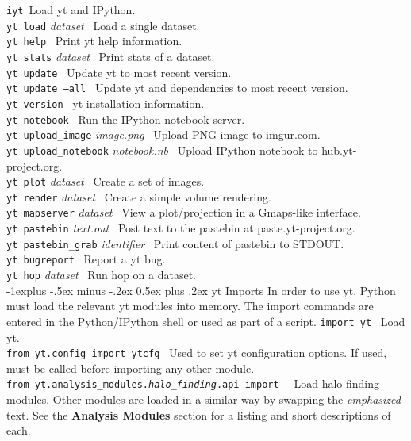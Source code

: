 \documentclass[10pt,landscape]{article}
\makeatletter
\renewcommand{\subsection}{\@startsection{subsection}{2}{0mm}%
                                {-1explus -.5ex minus -.2ex}%
                                {0.5ex plus .2ex}%
                                {\normalfont\normalsize\bfseries}}
\makeatother
\begin{document}
\begin{multicols}{3}
\texttt{iyt}\textemdash\ Load yt and IPython. \\
\texttt{yt load} \textit{dataset}   \textemdash\ Load a single dataset.  \\
\texttt{yt help} \textemdash\ Print yt help information. \\
\texttt{yt stats} \textit{dataset} \textemdash\ Print stats of a dataset. \\
\texttt{yt update} \textemdash\ Update yt to most recent version.\\
\texttt{yt update --all} \textemdash\ Update yt and dependencies to most recent version. \\
\texttt{yt version} \textemdash\ yt installation information. \\
\texttt{yt notebook} \textemdash\ Run the IPython notebook server. \\
\texttt{yt upload\_image} \textit{image.png} \textemdash\ Upload PNG image to imgur.com. \\
\texttt{yt upload\_notebook} \textit{notebook.nb} \textemdash\ Upload IPython notebook to hub.yt-project.org.\\
\texttt{yt plot} \textit{dataset} \textemdash\ Create a set of images.\\
\texttt{yt render} \textit{dataset} \textemdash\ Create a simple
 volume rendering. \\
\texttt{yt mapserver} \textit{dataset} \textemdash\ View a plot/projection in a Gmaps-like
 interface. \\
\texttt{yt pastebin} \textit{text.out} \textemdash\ Post text to the pastebin at
 paste.yt-project.org. \\
\texttt{yt pastebin\_grab} \textit{identifier} \textemdash\ Print content of pastebin to
 STDOUT. \\
\texttt{yt bugreport} \textemdash\ Report a yt bug. \\
\texttt{yt hop} \textit{dataset} \textemdash\  Run hop on a dataset. \\

\subsection{yt Imports}
In order to use yt, Python must load the relevant yt modules into memory.
The import commands are entered in the Python/IPython shell or
used as part of a script.
\newlength{\MyLen}
\texttt{import yt}  \textemdash\
Load yt. \\
\texttt{from yt.config import ytcfg}  \textemdash\
Used to set yt configuration options.
If used, must be called before importing any other module.\\
\texttt{from yt.analysis\_modules.\emph{halo\_finding}.api import \textasteriskcentered}  \textemdash\
Load halo finding modules. Other modules
are loaded in a similar way by swapping the
\emph{emphasized} text.
See the \textbf{Analysis Modules} section for a listing and short descriptions of each.


\end{multicols}
\end{document}
